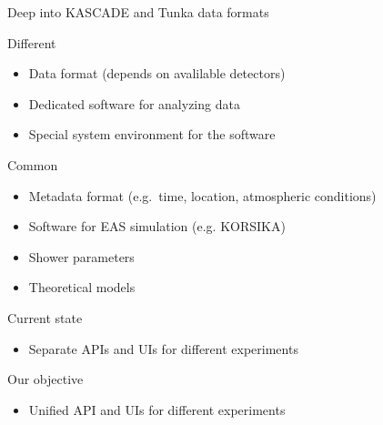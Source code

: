 \documentclass[18pt]{beamer}
\begin{document}
\begin{frame}{Deep into KASCADE and Tunka data formats}
\vspace{-2em}
\begin{minipage}[t]{0.48\textwidth}
  \begin{block}{Different}
    \begin{itemize}
      \item Data format (depends on avalilable detectors)
      \item Dedicated software for analyzing data
      \item Special system environment for the software
    \end{itemize}
  \end{block}
\end{minipage}
\hfill
\begin{minipage}[t]{0.48\textwidth}
  \begin{block}{Common}
    \begin{itemize}
      \item Metadata format (e.g.\ time, location, atmospheric conditions)
      \item Software for EAS simulation (e.g. KORSIKA)
      \item Shower parameters
      \item Theoretical models
    \end{itemize}
  \end{block}
\end{minipage}


\begin{minipage}[t]{0.48\textwidth}
  \begin{exampleblock}{Current state}
    \begin{itemize}
      \item Separate APIs and UIs for different experiments
    \end{itemize}
  \end{exampleblock}
\end{minipage}
\hfill
\begin{minipage}[t]{0.48\textwidth}
  \begin{exampleblock}{Our objective}
    \begin{itemize}
      \item Unified API and UIs for different experiments
    \end{itemize}
  \end{exampleblock}
\end{minipage}
\end{frame}
\end{document}
